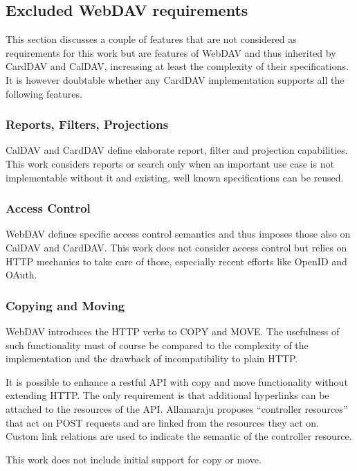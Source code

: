\documentclass[12pt,a4paper,twoside]{scrartcl}		%
\begin{document}
\subsection{Excluded WebDAV requirements}
\label{sec:excluded-requirements}

This section discusses a couple of features that are not considered as
requirements for this work but are features of WebDAV and thus inherited by
CardDAV and CalDAV, increasing at least the complexity of their
specifications. It is however doubtable whether any CardDAV implementation
supports all the following features.

\subsubsection{Reports, Filters, Projections}

CalDAV and CardDAV define elaborate report, filter and projection
capabilities. This work considers reports or search only when an important use
case is not implementable without it and existing, well known specifications can
be reused.

\subsubsection{Access Control}
WebDAV defines specific access control semantics and thus imposes those also on
CalDAV and CardDAV. This work does not consider access control but relies on
HTTP mechanics to take care of those, especially recent efforts like OpenID and
OAuth. %

\subsubsection{Copying and Moving}
WebDAV introduces the HTTP verbs to COPY and MOVE. The usefulness of such
functionality must of course be compared to the complexity of the implementation
and the drawback of incompatibility to plain HTTP.

It is possible to enhance a restful API with copy and move functionality without
extending HTTP. The only requirement is that additional hyperlinks can be
attached to the resources of the API. Allamaraju \cite[Ch. 11]{Allamaraju_2010} proposes
``controller resources'' that act on POST requests and are linked from the
resources they act on. Custom link relations are used to indicate the semantic
of the controller resource.

This work does not include initial support for copy or move.
\end{document}
